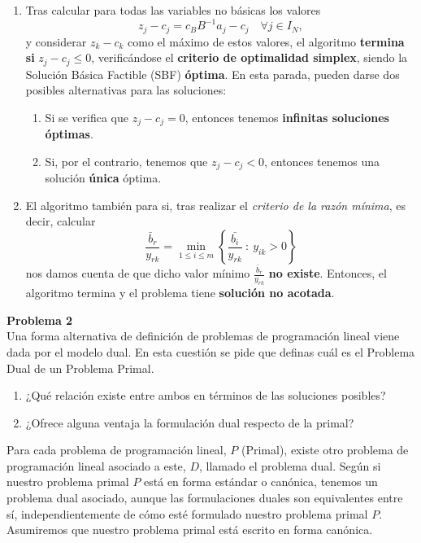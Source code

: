 \documentclass[a4paper]{article}
\newenvironment{problem}[2][Problema]
    { \begin{mdframed}[backgroundcolor=gray!20] \textbf{#1 #2} \\}
    {  \end{mdframed}}
\begin{document}
\begin{enumerate}
\item Tras calcular para todas las variables no básicas los valores
\[
z_j - c_j = c_B B^{-1}a_j - c_j \quad \forall j \in I_N,
\]
y considerar \(z_k - c_k\) como el máximo de estos valores, el algoritmo \textbf{termina si} \(z_j - c_j \leq 0\), verificándose el \textbf{criterio de optimalidad simplex}, siendo la Solución Básica Factible (SBF) \textbf{óptima}. En esta parada, pueden darse dos posibles alternativas para las soluciones:
\begin{enumerate}
\item Si se verifica que \(z_j - c_j = 0\), entonces tenemos \textbf{infinitas soluciones óptimas}.
\item Si, por el contrario, tenemos que \(z_j - c_j < 0\), entonces tenemos una solución \textbf{única} óptima.
\end{enumerate}

\item El algoritmo también para si, tras realizar el \emph{criterio de la razón mínima}, es decir, calcular
\[
\frac{\bar b_r}{y_{rk}} = \min_{1 \leq i \leq m} \left\{\frac{\bar{b_i}}{y_{rk}} \ : \ y_{ik} > 0\right\}  
\]
nos damos cuenta de que dicho valor mínimo \(\frac{\bar b_r}{y_{rk}} \) \textbf{no existe}. Entonces, el algoritmo termina y el problema tiene \textbf{solución no acotada}.
\end{enumerate}


\begin{problem}{2}
  Una forma alternativa de definición de problemas de programación lineal viene dada por el modelo dual. En esta cuestión se pide que definas cuál es el Problema Dual de un Problema Primal.
  \begin{enumerate}
\item ¿Qué relación existe entre ambos en términos de las soluciones posibles?
\item ¿Ofrece alguna ventaja la formulación dual respecto de la primal?
  \end{enumerate}
\end{problem}
Para cada problema de programación lineal, \(P\) (Primal), existe otro problema de programación lineal asociado a este, \(D\), llamado el problema dual. Según si nuestro problema primal \(P\) está en forma estándar o canónica, tenemos un problema dual asociado, aunque las formulaciones duales son equivalentes entre sí, independientemente de cómo esté formulado nuestro problema primal \(P\). Asumiremos que nuestro problema primal está escrito en forma canónica.\\
\end{document}
